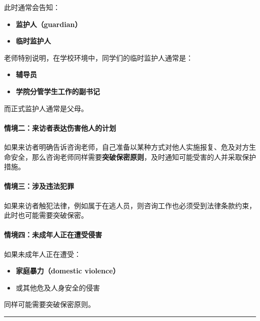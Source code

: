 \documentclass[
  chinese,
  9pt,
  a4paper,
]{ctexart}
\providecommand{\tightlist}{%
  \setlength{\itemsep}{0pt}\setlength{\parskip}{0pt}}
\begin{document}
此时通常会告知：

\begin{itemize}
\tightlist
\item
  \textbf{监护人（guardian）}
\item
  \textbf{临时监护人}
\end{itemize}

老师特别说明，在学校环境中，同学们的临时监护人通常是：

\begin{itemize}
\tightlist
\item
  \textbf{辅导员}
\item
  \textbf{学院分管学生工作的副书记}
\end{itemize}

而正式监护人通常是父母。

\paragraph{情境二：来访者表达伤害他人的计划}\label{ux60c5ux5883ux4e8cux6765ux8bbfux8005ux8868ux8fbeux4f24ux5bb3ux4ed6ux4ebaux7684ux8ba1ux5212}

如果来访者明确告诉咨询老师，自己准备以某种方式对他人实施报复、危及对方生命安全，那么咨询老师同样需要\textbf{突破保密原则}，及时通知可能受害的人并采取保护措施。

\paragraph{情境三：涉及违法犯罪}\label{ux60c5ux5883ux4e09ux6d89ux53caux8fddux6cd5ux72afux7f6a}

如果来访者触犯法律，例如属于在逃人员，则咨询工作也必须受到法律条款约束，此时也可能需要突破保密。

\paragraph{情境四：未成年人正在遭受侵害}\label{ux60c5ux5883ux56dbux672aux6210ux5e74ux4ebaux6b63ux5728ux906dux53d7ux4fb5ux5bb3}

如果未成年人正在遭受：

\begin{itemize}
\tightlist
\item
  \textbf{家庭暴力（domestic violence）}
\item
  或其他危及人身安全的侵害
\end{itemize}

同样可能需要突破保密原则。

\begin{center}\rule{0.5\linewidth}{0.5pt}\end{center}
\end{document}
